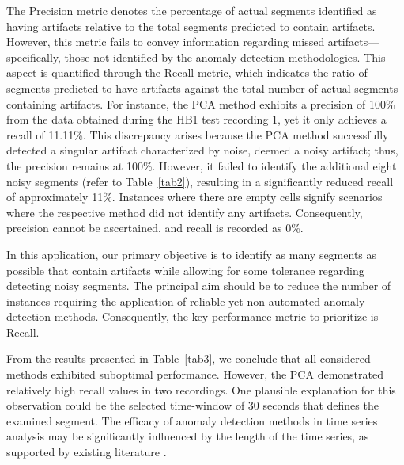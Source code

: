 The Precision metric denotes the percentage of actual segments identified as having artifacts relative to the total segments predicted to contain artifacts. However, this metric fails to convey information regarding missed artifacts---specifically, those not identified by the anomaly detection methodologies. This aspect is quantified through the Recall metric, which indicates the ratio of segments predicted to have artifacts against the total number of actual segments containing artifacts. For instance, the PCA method exhibits a precision of 100\% from the data obtained during the HB1 test recording 1, yet it only achieves a recall of 11.11\%. This discrepancy arises because the PCA method successfully detected a singular artifact characterized by noise, deemed a noisy artifact; thus, the precision remains at 100\%. However, it failed to identify the additional eight noisy segments (refer to Table~\ref{tab2}), resulting in a significantly reduced recall of approximately 11\%. Instances where there are empty cells signify scenarios where the respective method did not identify any artifacts. Consequently, precision cannot be ascertained, and recall is recorded as 0\%.

In this application, our primary objective is to identify as many segments as possible that contain artifacts while allowing for some tolerance regarding detecting noisy segments. The principal aim should be to reduce the number of instances requiring the application of reliable yet non-automated anomaly detection methods. Consequently, the key performance metric to prioritize is Recall.

From the results presented in Table~\ref{tab3}, we conclude that all considered methods exhibited suboptimal performance. However, the PCA demonstrated relatively high recall values in two recordings. One plausible explanation for this observation could be the selected time-window of 30 seconds that defines the examined segment. The efficacy of anomaly detection methods in time series analysis may be significantly influenced by the length of the time series, as supported by existing literature \cite{Lee_2021}.

